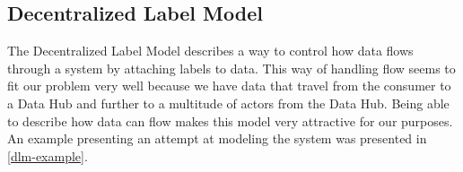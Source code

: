 \subsection{Decentralized Label Model}
The Decentralized Label Model describes a way to control how data flows through a system by attaching labels to data.
This way of handling flow seems to fit our problem very well because we have data that travel from the consumer to a Data Hub and further to a multitude of actors from the Data Hub.
Being able to describe how data can flow makes this model very attractive for our purposes.
An example presenting an attempt at modeling the system was presented in \cref{dlm-example}.